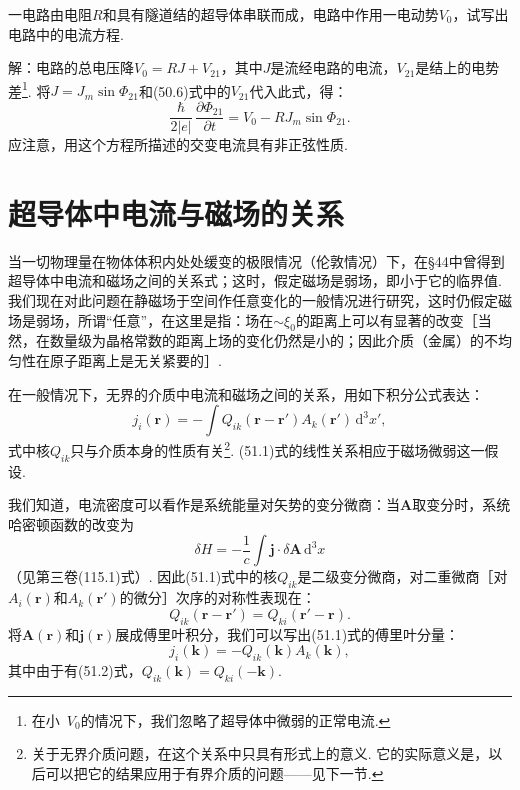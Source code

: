 \begin{xiti}

一电路由电阻$R$和具有隧道结的超导体串联而成，电路中作用一电动势$V_0$，试写出电路中的电流方程.

{\heiti 解：}电路的总电压降$V_0=RJ+V_{21}$，其中$J$是流经电路的电流，$V_{21}$是结上的电势差\footnote{在小~$V_0$的情况下，我们忽略了超导体中微弱的正常电流.}. 将$J=J_m\sin\Phi_{21}$和(50.6)式中的$V_{21}$代入此式，得：
\begin{equation*}
\frac{\hbar}{2|e|}\,\frac{\partial\Phi_{21}}{\partial t}
=V_0-RJ_m\sin\Phi_{21}.
\end{equation*}
应注意，用这个方程所描述的交变电流具有非正弦性质.

\end{xiti}

\section{超导体中电流与磁场的关系}

当一切物理量在物体体积内处处缓变的极限情况（伦敦情况）下，在§44中曾得到超导体中电流和磁场之间的关系式；这时，假定磁场是弱场，即小于它的临界值. 我们现在对此问题在静磁场于空间作任意变化的一般情况进行研究，这时仍假定磁场是弱场，所谓“任意”，在这里是指：场在$\sim\xi_0$的距离上可以有显著的改变［当然，在数量级为晶格常数的距离上场的变化仍然是小的；因此介质（金属）的不均匀性在原子距离上是无关紧要的］.

在一般情况下，无界的介质中电流和磁场之间的关系，用如下积分公式表达：
\begin{equation}
j_i(\bm{r})=-\int Q_{ik}(\bm{r}-\bm{r}')A_k(\bm{r}')\,\mathrm{d}^3x',
\end{equation}
式中核$Q_{ik}$只与介质本身的性质有关\footnote{关于无界介质问题，在这个关系中只具有形式上的意义. 它的实际意义是，以后可以把它的结果应用于有界介质的问题——见下一节.}. (51.1)式的线性关系相应于磁场微弱这一假设.

我们知道，电流密度可以看作是系统能量对矢势的变分微商：当$\bm{A}$取变分时，系统哈密顿函数的改变为
\begin{equation*}
\delta H=-\frac{1}{c}\int\bm{j}\cdot\delta\bm{A}\,\mathrm{d}^3x
\end{equation*}
（见第三卷(115.1)式）. 因此(51.1)式中的核$Q_{ik}$是二级变分微商，对二重微商［对$A_i(\bm{r})$和$A_k(\bm{r}')$的微分］次序的对称性表现在：
\begin{equation}
Q_{ik}(\bm{r}-\bm{r}')=Q_{ki}(\bm{r}'-\bm{r}).
\end{equation}
将$\bm{A}(\bm{r})$和$\bm{j}(\bm{r})$展成傅里叶积分，我们可以写出(51.1)式的傅里叶分量：
\begin{equation}
j_i(\bm{k})=-Q_{ik}(\bm{k})A_k(\bm{k}),
\end{equation}
其中由于有(51.2)式，$Q_{ik}(\bm{k})=Q_{ki}(-\bm{k})$.

